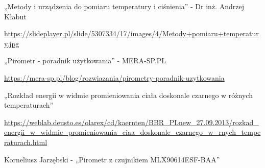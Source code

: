 

\begin{thebibliography}{999}
\begin{spacing}{1}


    





    

     „Metody i urządzenia do pomiaru temperatury i ciśnienia” - Dr inż. Andrzej Kłabut

    \url{https://slideplayer.pl/slide/5307334/17/images/4/Metody+pomiaru+temperatury.jpg}

     „Pirometr - poradnik użytkowania” - MERA-SP.PL

    \url{https://mera-sp.pl/blog/rozwiazania/pirometry-poradnik-uzytkowania}

     „Rozkład energii w widmie promieniowania ciała doskonale czarnego w różnych temperaturach”

    \url{https://weblab.deusto.es/olarex/cd/kaernten/BBR_PLnew_27.09.2013/rozkad_energii_w_widmie_promieniowania_ciaa_doskonale_czarnego_w_rnych_temperaturach.html}

     Korneliusz Jarzębski - „Pirometr z czujnikiem MLX90614ESF-BAA”


\end{spacing}
\end{thebibliography}
